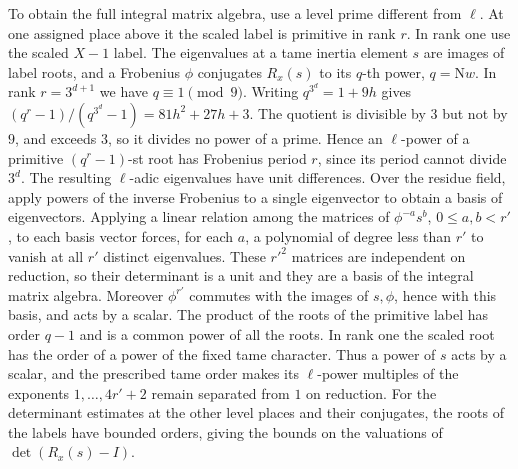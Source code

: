 To obtain the full integral matrix algebra, use a level prime different from \(\ell\).
At one assigned place above it the scaled label is primitive in rank \(r\).
In rank one use the scaled \(X-1\) label.
The eigenvalues at a tame inertia element \(s\) are images of label roots, and a Frobenius
\(\phi\) conjugates \(R_x(s)\) to its \(q\)-th power, \(q=\mathrm Nw\).
In rank \(r=3^{d+1}\) we have \(q\equiv1\pmod9\).
Writing \(q^{3^d}=1+9h\) gives \((q^r-1)/(q^{3^d}-1)=81h^2+27h+3\).
The quotient is divisible by \(3\) but not by \(9\),
and exceeds \(3\), so it divides no power of a prime. Hence an \(\ell\)-power of a primitive
\((q^r-1)\)-st root has Frobenius period \(r\), since its period cannot divide \(3^d\).
The resulting \(\ell\)-adic eigenvalues have unit differences. Over the residue field,
apply powers of the inverse Frobenius to a single eigenvector to obtain a basis of eigenvectors.
Applying a linear relation among the matrices of \(\phi^{-a}s^b\), \(0\le a,b<r'\),
to each basis vector forces, for each \(a\), a polynomial of degree less than \(r'\) to
vanish at all \(r'\) distinct eigenvalues. These \(r'^2\) matrices are independent on reduction,
so their determinant is a unit and they are a basis of the integral matrix algebra.
Moreover \(\phi^{r'}\) commutes with the images of \(s,\phi\), hence with this basis, and acts
by a scalar. The product of the roots of the primitive label has order \(q-1\) and is a common
power of all the roots. In rank one the scaled root has the order of a power of the fixed tame
character. Thus a power of \(s\) acts by a scalar, and the prescribed tame order makes its
\(\ell\)-power multiples of the exponents \(1,\ldots,4r'+2\) remain separated from \(1\) on reduction.
For the determinant estimates at the other level places and their conjugates, the roots of the
labels have bounded orders, giving the bounds on the valuations of \(\det(R_x(s)-I)\).

